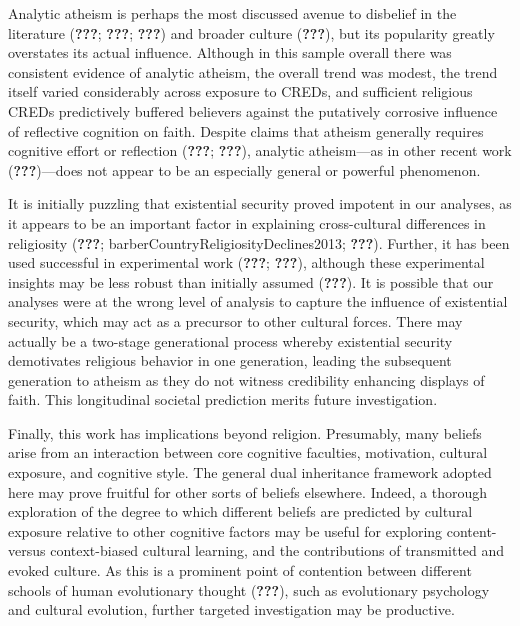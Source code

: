 \documentclass[english,man,mask]{article}
\begin{document}
Analytic atheism is perhaps the most discussed avenue to disbelief in the literature ({\textbf{???}}; {\textbf{???}}; {\textbf{???}}) and broader culture ({\textbf{???}}), but its popularity greatly overstates its actual influence. Although in this sample overall there was consistent evidence of analytic atheism, the overall trend was modest, the trend itself varied considerably across exposure to CREDs, and sufficient religious CREDs predictively buffered believers against the putatively corrosive influence of reflective cognition on faith. Despite claims that atheism generally requires cognitive effort or reflection ({\textbf{???}}; {\textbf{???}}), analytic atheism---as in other recent work ({\textbf{???}})---does not appear to be an especially general or powerful phenomenon.

It is initially puzzling that existential security proved impotent in our analyses, as it appears to be an important factor in explaining cross-cultural differences in religiosity ({\textbf{???}}; barberCountryReligiosityDeclines2013; {\textbf{???}}). Further, it has been used successful in experimental work ({\textbf{???}}; {\textbf{???}}), although these experimental insights may be less robust than initially assumed ({\textbf{???}}). It is possible that our analyses were at the wrong level of analysis to capture the influence of existential security, which may act as a precursor to other cultural forces. There may actually be a two-stage generational process whereby existential security demotivates religious behavior in one generation, leading the subsequent generation to atheism as they do not witness credibility enhancing displays of faith. This longitudinal societal prediction merits future investigation.

Finally, this work has implications beyond religion. Presumably, many beliefs arise from an interaction between core cognitive faculties, motivation, cultural exposure, and cognitive style. The general dual inheritance framework adopted here may prove fruitful for other sorts of beliefs elsewhere. Indeed, a thorough exploration of the degree to which different beliefs are predicted by cultural exposure relative to other cognitive factors may be useful for exploring content- versus context-biased cultural learning, and the contributions of transmitted and evoked culture. As this is a prominent point of contention between different schools of human evolutionary thought ({\textbf{???}}), such as evolutionary psychology and cultural evolution, further targeted investigation may be productive.
\end{document}
